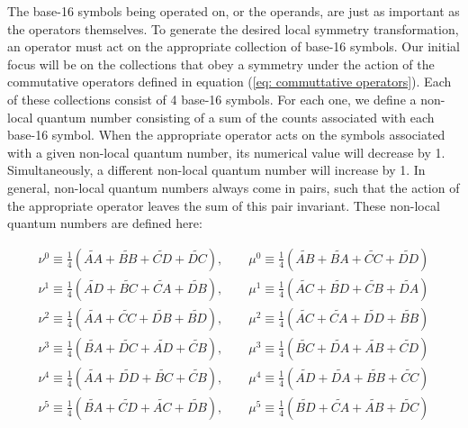 \documentclass{article}
\begin{document}
The base-16 symbols being operated on, or the operands, are just as important as the operators themselves. To generate the desired local symmetry transformation, an operator must act on the appropriate collection of base-16 symbols. Our initial focus will be on the collections that obey a symmetry under the action of the commutative operators defined in equation (\ref{eq: commuttative operators}). Each of these collections consist of 4 base-16 symbols. For each one, we define a non-local quantum number consisting of a sum of the counts associated with each base-16 symbol. When the appropriate operator acts on the symbols associated with a given non-local quantum number, its numerical value will decrease by 1. Simultaneously, a different non-local quantum number will increase by 1. In general, non-local quantum numbers always come in pairs, such that the action of the appropriate operator leaves the sum of this pair invariant. These non-local quantum numbers are defined here:

\begin{equation}
\begin{array}{cc}
     \nu^{0}\equiv\frac{1}{4}( \widetilde{AA}+\widetilde{BB}+\widetilde{CD}+\widetilde{DC}), 
     \qquad \mu^{0}\equiv\frac{1}{4}( \widetilde{AB}+\widetilde{BA}+\widetilde{CC}+\widetilde{DD})\\
     \nu^{1}\equiv\frac{1}{4}( \widetilde{AD}+\widetilde{BC}+\widetilde{CA}+\widetilde{DB}), 
     \qquad \mu^{1}\equiv\frac{1}{4}( \widetilde{AC}+\widetilde{BD}+\widetilde{CB}+\widetilde{DA})\\
     \nu^{2}\equiv\frac{1}{4}( \widetilde{AA}+\widetilde{CC}+\widetilde{DB}+\widetilde{BD}),
     \qquad \mu^{2}\equiv\frac{1}{4}( \widetilde{AC}+\widetilde{CA}+\widetilde{DD}+\widetilde{BB})\\
     \nu^{3}\equiv\frac{1}{4}( \widetilde{BA}+\widetilde{DC}+\widetilde{AD}+\widetilde{CB}), 
     \qquad \mu^{3}\equiv\frac{1}{4}( \widetilde{BC}+\widetilde{DA}+\widetilde{AB}+\widetilde{CD})\\
     \nu^{4}\equiv\frac{1}{4}( \widetilde{AA}+\widetilde{DD}+\widetilde{BC}+\widetilde{CB}),
     \qquad \mu^{4}\equiv\frac{1}{4}( \widetilde{AD}+\widetilde{DA}+\widetilde{BB}+\widetilde{CC})\\
     \nu^{5}\equiv\frac{1}{4}( \widetilde{BA}+\widetilde{CD}+\widetilde{AC}+\widetilde{DB}), 
     \qquad \mu^{5}\equiv\frac{1}{4}( \widetilde{BD}+\widetilde{CA}+\widetilde{AB}+\widetilde{DC})
\end{array}
\label{eq: nu and mu}
\end{equation}
\end{document}
